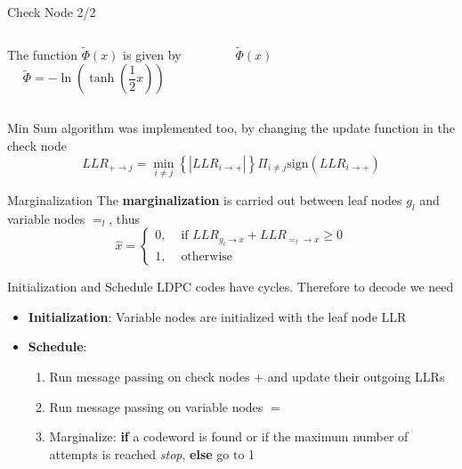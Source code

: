 \documentclass[pdf]
          {beamer}
\newlength\fheight
\newlength\fwidth
\begin{document}
\begin{frame}{Check Node 2/2}
	\begin{columns}
	The function $\tilde{\Phi} (x) $ is given by
	$$
		\tilde{\Phi} = - \ln \left( \tanh \left(\frac{1}{2} x\right)\right)
	$$
	\begin{figure}[t]
		\centering
		\setlength{}
		\setlength{}
		
		\caption{$\tilde{\Phi}(x)$}
		\label{fig:info_uni}
	\end{figure}
	\end{columns}
	\vfill
	Min Sum algorithm was implemented too, by changing the update function in the check node
	$$
		LLR_{+\rightarrow j} = \min_{i \ne j} \left\{ |LLR_{i \rightarrow +}| \right\} \Pi_{i \ne j} \mbox{sign} \left( LLR_{i \rightarrow +} \right)
	$$

\end{frame}

\begin{frame}{Marginalization}
	The \textbf{marginalization} is carried out between leaf nodes $g_l$ and variable nodes $=_l$, thus
	$$
		\hat{x} =
		\begin{cases}
			0, &\text{ if }LLR_{g_l \rightarrow x} + LLR_{=_l \rightarrow x} \ge 0\\
			1, &\text{ otherwise }
		\end{cases}
	$$
\end{frame}

\begin{frame}{Initialization and Schedule}
	LDPC codes have cycles. Therefore to decode we need
	\begin{itemize}
		\item \textbf{Initialization}: Variable nodes are initialized with the leaf node LLR
		\item \textbf{Schedule}: 
		\begin{enumerate}
			\item Run message passing on check nodes $+$ and update their outgoing LLRs
			\item Run message passing on variable nodes $=$
			\item Marginalize: \textbf{if} a codeword is found or if the maximum number of attempts is reached \textit{stop}, \textbf{else} go to 1
		\end{enumerate}
	\end{itemize}
\end{frame}
\end{document}
